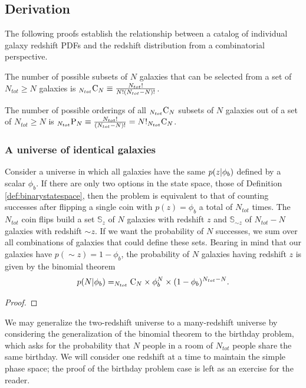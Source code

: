 \subsection{Derivation}
\label{sec:pedanticmath}

The following proofs establish the relationship between a catalog of individual galaxy redshift PDFs and the redshift distribution from a combinatorial perspective.
\begin{definition}
	 The number of possible subsets of $N$ galaxies that can be selected from a set of $N_{tot} \geq N$ galaxies is $_{N_{tot}}\mathrm{C}_{N} \equiv \frac{N_{tot}!}{N! (N_{tot} - N)!}$.
\end{definition}
\begin{definition}
	The number of possible orderings of all $_{N_{tot}}\mathrm{C}_{N}$ subsets of $N$ galaxies out of a set of $N_{tot} \geq N$ is $_{N_{tot}}\mathrm{P}_{N} \equiv \frac{N_{tot}!}{(N_{tot}-N)!} = N!_{N_{tot}}\mathrm{C}_{N}$.
\end{definition}

\subsubsection{A universe of identical galaxies}

\begin{theorem}
Consider a universe in which all galaxies have the same \pzpdf $p(z \vert \phi_{b})$ defined by a scalar $\phi_{b}$.
If there are only two options in the state space, those of Definition \ref{def:binarystatespace}, then the problem is equivalent to that of counting successes after flipping a single coin with $p(z) = \phi_{b}$ a total of $N_{tot}$ times.
The $N_{tot}$ coin flips build a set $\mathbb{S}_{z}$ of $N$ galaxies with redshift $z$ and $\mathbb{S}_{\sim z}$ of $N_{tot} - N$ galaxies with redshift $\sim z$.
If we want the probability of $N$ successes, we sum over all combinations of galaxies that could define these sets.
Bearing in mind that our galaxies have $p(\sim z) = 1 - \phi_{b}$, the probability of $N$ galaxies having redshift $z$ is given by the binomial theorem
\begin{equation}
\eqlabel{eq:binomial}
p(N \gvn \phi_{b}) = \comb{N_{tot}}{N} \times \phi_{b}^{N} \times (1 - \phi_{b})^{N_{tot} - N} .
\end{equation}
\end{theorem}
\begin{proof}
\end{proof}
We may generalize the two-redshift universe to a many-redshift universe by considering the generalization of the binomial theorem to the birthday problem, which asks for the probability that $N$ people in a room of $N_{tot}$ people share the same birthday.
We will consider one redshift at a time to maintain the simple phase space; the proof of the birthday problem case is left as an exercise for the reader.

